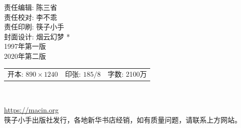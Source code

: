 \begin{center}
        \vfill
        \bigskip

        {责任编辑: 陈\hspace{0.5em}三\hspace{0.5em}省 \\ 责任校对: 李\hspace{0.5em}不\hspace{0.5em}乖\\ 
        责任印刷: 筷子小手\\封面设计: 烟云幻梦}
        \vfill
        \bigskip
        *\\
        \bigskip
        {1997年第一版 \\ 2020年第二版}\\
        {\begin{tabular}{lll} 开本: $890\times1240 $ & 印张: $18 5/8$ & 字数: 2100万\\  
        \end{tabular}}\\ 

        \bigskip

        \href{https://macin.org}{https://macin.org}\\ 
        筷子小手出版社发行，各地新华书店经销，如有质量问题，请联系上方网站。\\ 
    
    \end{center}





